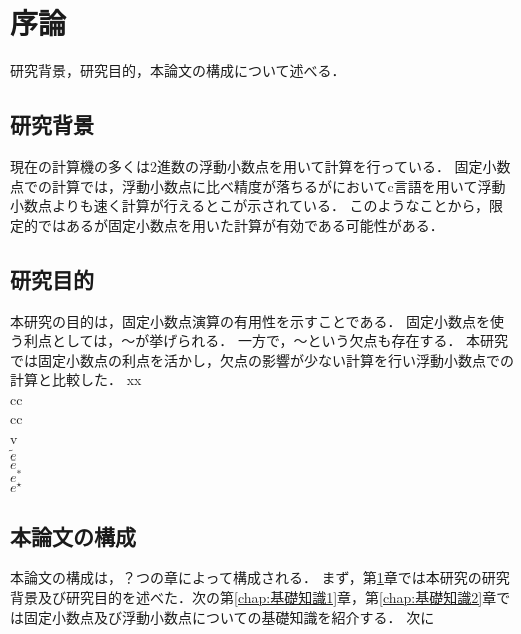 \chapter{序論}
\label{chap:序論}
研究背景，研究目的，本論文の構成について述べる．

\section{研究背景}
現在の計算機の多くは2進数の浮動小数点を用いて計算を行っている．
固定小数点での計算では，浮動小数点に比べ精度が落ちるが\cite{IJERTV12IS010134}においてc言語を用いて浮動小数点よりも速く計算が行えるとこが示されている．
このようなことから，限定的ではあるが固定小数点を用いた計算が有効である可能性がある．

\section{研究目的}
本研究の目的は，固定小数点演算の有用性を示すことである．
固定小数点を使う利点としては，〜が挙げられる．
一方で，〜という欠点も存在する．
本研究では固定小数点の利点を活かし，欠点の影響が少ない計算を行い浮動小数点での計算と比較した．
xx\\
cc \\
cc\\
v\\
$\tilde{e} $\\
$\bar{e}$\\
$e^{\ast}$\\
$e^{\star}$\\
\section{本論文の構成}
本論文の構成は，？つの章によって構成される．
まず，第\ref{chap:序論}章では本研究の研究背景及び研究目的を述べた．次の第\ref{chap:基礎知識1}章，第\ref{chap:基礎知識2}章では固定小数点及び浮動小数点についての基礎知識を紹介する．
次に\cite{hopkins2020stochastic}
